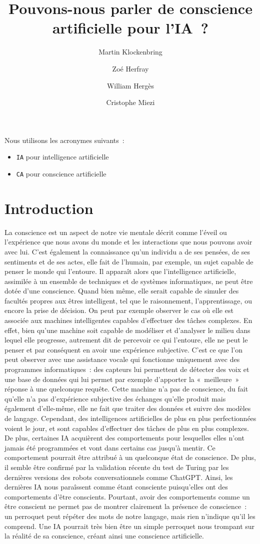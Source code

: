 \documentclass[a4paper, titlepage, 12pt]{article}
\title{Pouvons-nous parler de conscience artificielle pour l'IA~?}
\author{
	Martin Klockenbring
	\and
	Zoé Herfray
	\and
	William Hergès
	\and
	Cristophe Miezi
}
\begin{document}
	\maketitle
	\tableofcontents
	\newpage

	Nous utilisons les acronymes suivants~:
	\begin{itemize}
		\item \verb|IA| pour intelligence artificielle
		\item \verb|CA| pour conscience artificielle
	\end{itemize}

	\newpage
	\section{Introduction}
	La conscience est un aspect de notre vie mentale décrit comme l’éveil ou l’expérience que nous avons du monde et les interactions que nous pouvons avoir avec lui. C’est également la connaissance qu’un individu a de ses pensées, de ses sentiments et de ses actes, elle fait de l’humain, par exemple, un sujet capable de penser le monde qui l’entoure. Il apparaît alors que l’intelligence artificielle, assimilée à un ensemble de techniques et de systèmes informatiques, ne peut être dotée d’une conscience. Quand bien même, elle serait capable de simuler des facultés propres aux êtres intelligent, tel que le raisonnement, l’apprentissage, ou encore la prise de décision. On peut par exemple observer le cas où elle est associée aux machines intelligentes capables d’effectuer des tâches complexes. En effet, bien qu’une machine soit capable de modéliser et d’analyser le milieu dans lequel elle progresse, autrement dit de percevoir ce qui l’entoure, elle ne peut le penser et par conséquent en avoir une expérience subjective. C’est ce que l’on peut observer avec une assistance vocale qui fonctionne uniquement avec des programmes informatiques~: des capteurs lui permettent de détecter des voix et une base de données qui lui permet par exemple d’apporter la «~meilleure~» réponse à une quelconque requête.  Cette machine n’a pas de conscience, du fait qu’elle n’a pas d’expérience subjective des échanges qu’elle produit mais également d'elle-même, elle ne fait que traiter des données et suivre des modèles de langage.	Cependant, des intelligences artificielles de plus en plus perfectionnées voient le jour, et sont capables d’effectuer des tâches de plus en plus complexes. De plus, certaines IA acquièrent des comportements pour lesquelles elles n’ont jamais été programmées et vont dans certains cas jusqu’à mentir. Ce comportement pourrait être attribué à un quelconque état de conscience. De plus, il semble être confirmé par la validation récente du test de Turing par les dernières versions des robots conversationnels comme ChatGPT. Ainsi, les dernières IA nous paraîssent comme étant consciente puisqu'elles ont des comportements d'être conscients. Pourtant, avoir des comportements comme un être conscient ne permet pas de montrer clairement la présence de conscience~: un perroquet peut répéter des mots de notre langage, mais rien n'indique qu'il les comprend. Une IA pourrait très bien être un simple perroquet nous trompant sur la réalité de sa conscience, créant ainsi une conscience artificielle.
	
\end{document}
